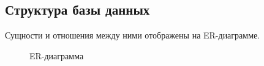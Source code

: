 \subsection{Структура базы данных}
Сущности и отношения между ними отображены на ER-диаграмме.
 \begin{figure}[ht]
	\caption{ER-диаграмма}
	\label{er_diagram:image}
\end{figure}
